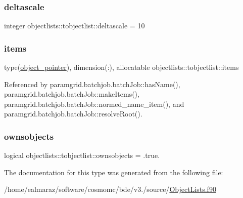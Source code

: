 \subsubsection{\texorpdfstring{deltascale}{deltascale}}
{\footnotesize\ttfamily integer objectlists\+::tobjectlist\+::deltascale = 10\hspace{0.3cm}{\ttfamily [private]}}

\mbox{\label{structobjectlists_1_1tobjectlist_a6a7277796208d0428dde76a6e9524ada}} 
\subsubsection{\texorpdfstring{items}{items}}
{\footnotesize\ttfamily type(\mbox{\hyperlink{structobjectlists_1_1object__pointer}{object\+\_\+pointer}}), dimension(\+:), allocatable objectlists\+::tobjectlist\+::items\hspace{0.3cm}{\ttfamily [private]}}



Referenced by paramgrid.\+batchjob.\+batch\+Job\+::has\+Name(), paramgrid.\+batchjob.\+batch\+Job\+::make\+Items(), paramgrid.\+batchjob.\+batch\+Job\+::normed\+\_\+name\+\_\+item(), and paramgrid.\+batchjob.\+batch\+Job\+::resolve\+Root().

\mbox{\label{structobjectlists_1_1tobjectlist_ab089fe989e42aa770260adff8c4b8d13}} 
\subsubsection{\texorpdfstring{ownsobjects}{ownsobjects}}
{\footnotesize\ttfamily logical objectlists\+::tobjectlist\+::ownsobjects = .true.\hspace{0.3cm}{\ttfamily [private]}}



The documentation for this type was generated from the following file\+:\begin{DoxyCompactItemize}
\item 
/home/ealmaraz/software/cosmomc/bde/v3./source/\mbox{\hyperlink{ObjectLists_8f90}{Object\+Lists.\+f90}}\end{DoxyCompactItemize}
